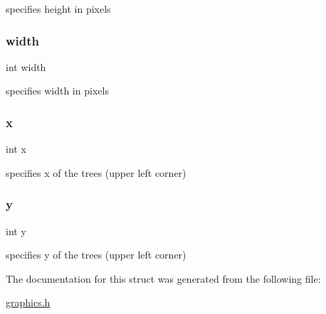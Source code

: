 specifies height in pixels 

\mbox{\label{struct_tree_a2474a5474cbff19523a51eb1de01cda4}} 
\subsubsection{\texorpdfstring{width}{width}}
{\footnotesize\ttfamily int width}



specifies width in pixels 

\mbox{\label{struct_tree_a6150e0515f7202e2fb518f7206ed97dc}} 
\subsubsection{\texorpdfstring{x}{x}}
{\footnotesize\ttfamily int x}



specifies x of the trees (upper left corner) 

\mbox{\label{struct_tree_a0a2f84ed7838f07779ae24c5a9086d33}} 
\subsubsection{\texorpdfstring{y}{y}}
{\footnotesize\ttfamily int y}



specifies y of the trees (upper left corner) 



The documentation for this struct was generated from the following file\+:\begin{DoxyCompactItemize}
\item 
\hyperlink{graphics_8h}{graphics.\+h}\end{DoxyCompactItemize}
